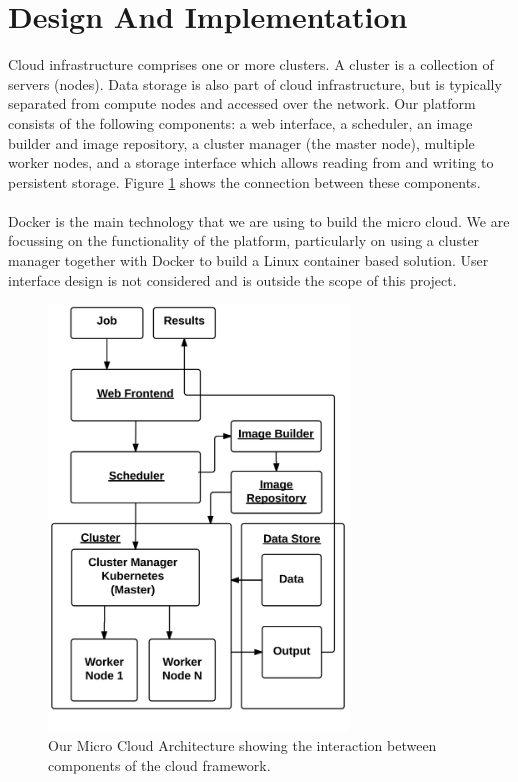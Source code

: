 \documentclass{sig-alternate-05-2015}
\begin{document}
\section{Design And Implementation}


Cloud infrastructure comprises one or more clusters. A cluster is a collection of servers (nodes). Data storage is also part of cloud infrastructure, but is typically separated from compute nodes and accessed over the network. Our platform consists of the following components: a web interface, a scheduler, an image builder and image repository, a cluster manager (the master node), multiple worker nodes, and a storage interface which allows reading from and writing to persistent storage. Figure \ref{fig:architecture} shows the connection between these components.
\\\\
Docker is the main technology that we are using to build the micro cloud. We are focussing on the functionality of the platform, particularly on using a cluster manager together with Docker to build a Linux container based solution. User interface design is not considered and is outside the scope of this project. 

\begin{figure}[h]
\includegraphics[width=8cm]{img/microcloud_architecture}
\caption{Our Micro Cloud Architecture showing the interaction between components of the cloud framework.}
\label{fig:architecture}
\end{figure}
\end{document}
